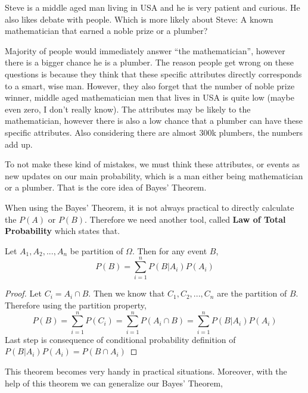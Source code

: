 \begin{example}
    Steve is a middle aged man  living in USA and he is very patient and curious. He also likes debate with people.  Which is more likely about Steve: A known mathematician that earned a noble prize or a plumber? 
    \newline
    \par
    Majority of people would immediately answer ``the mathematician'', however there is a bigger chance he is a plumber. The reason people get wrong on these questions is because they think that these specific attributes directly corresponds to a smart, wise man. However, they also forget that the number of  noble prize winner, middle aged mathematician men that lives in USA is quite low (maybe even zero, I don't really know).
    The attributes may be likely to the mathematician, however there is also a low chance that a plumber can have these specific attributes. Also considering there are almost $300$k plumbers, the numbers add up.

    \par 

    To not make these kind of mistakes, we must think these attributes, or events as new updates on our main probability, which is a man either being mathematician or a plumber. That is the core idea of Bayes' Theorem.
\end{example}

\par 

When using the Bayes' Theorem, it is not always practical to directly calculate the $P(A)$ or $P(B)$. Therefore we need another tool, called \textbf{Law of Total Probability} which states that.
\\
\begin{theorem} Let $A_1,A_2,...,A_n$ be partition of $\Omega$. Then for any event $B$,
    $$P(B)= \sum_{i=1}^n P(B|A_i)P(A_i)$$
    
\end{theorem}
\begin{proof}
    Let $C_i=A_i \cap B$. Then we know that $C_1,C_2,...,C_n$ are the partition of $B$. Therefore using the partition property,
    $$ P(B)= \sum_{i=1}^n P(C_i) = \sum_{i=1}^n P(A_i \cap B) =\sum_{i=1}^n P(B|A_i)P(A_i) $$
    Last step is consequence of conditional probability definition of $P(B|A_i)P(A_i)=P(B \cap A_i)$
\end{proof}

\par
This theorem becomes very handy in practical situations. Moreover, with the help of this theorem we can generalize our Bayes' Theorem,

